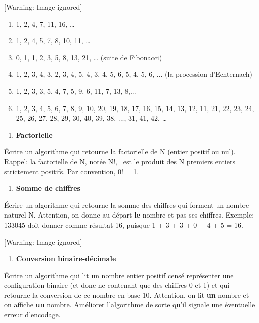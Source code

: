 \begin{center}
 [Warning: Image ignored] %

\end{center}
\liststyleNumberingv
\begin{enumerate}
\item {
1, 2, 4, 7, 11, 16, …}
\item {
1, 2, 4, 5, 7, 8, 10, 11, …}
\item {
0, 1, 1, 2, 3, 5, 8, 13, 21, … (suite de Fibonacci)}
\item {
1, 2, 3, 4, 3, 2, 3, 4, 5, 4, 3, 4, 5, 6, 5, 4, 5, 6, ... 
(la procession d'Echternach)}
\item {
1, 2, 3, 3, 5, 4, 7, 5, 9, 6, 11, 7, 13, 8,... \ }
\item {
1, 2, 3, 4, 5, 6, 7, 8, 9, 10, 20, 19, 18, 17, 16, 15, 14, 13, 12, 11,
21, 22, 23, 24, 25, 26, 27, 28, 29, 30, 40, 39, 38, ..., 31, 41, 42, …}
\end{enumerate}
\liststyleExercice
\begin{enumerate}
\item {\sffamily\bfseries
Factorielle}
\end{enumerate}
{
Écrire un algorithme qui retourne la factorielle de N (entier positif ou
nul). Rappel: la factorielle de N, notée N!, \ est le produit des N
premiers entiers strictement positifs. Par convention, 0! = 1.}

\liststyleExercice
\setcounter{saveenum}{\value{enumi}}
\begin{enumerate}
\setcounter{enumi}{\value{saveenum}}
\item {\sffamily\bfseries
Somme de chiffres}
\end{enumerate}
{
Écrire un algorithme qui retourne la somme des chiffres qui forment un
nombre naturel N. Attention, on donne au départ \textbf{le} nombre et
pas ses chiffres. Exemple: 133045 doit donner comme résultat 16,
puisque 1 + 3 + 3 + 0 + 4 + 5 = 16.}

\begin{center}
 [Warning: Image ignored] %

\end{center}
\liststyleExercice
\setcounter{saveenum}{\value{enumi}}
\begin{enumerate}
\setcounter{enumi}{\value{saveenum}}
\item {\sffamily\bfseries
Conversion binaire-décimale}
\end{enumerate}
{
Écrire un algorithme qui lit un nombre entier positif censé représenter
une configuration binaire (et donc ne contenant que des chiffres 0 et
1) et qui retourne la conversion de ce nombre en base 10. Attention, on
lit \textbf{un} nombre et on affiche \textbf{un} nombre. Améliorer
l’algorithme de sorte qu’il signale une éventuelle erreur d’encodage.}

